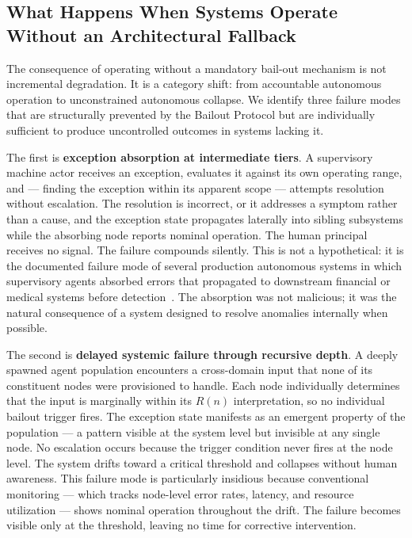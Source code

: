 \subsection{What Happens When Systems Operate Without an Architectural Fallback}

The consequence of operating without a mandatory bail-out mechanism is not incremental degradation. It is a category shift: from accountable autonomous operation to unconstrained autonomous collapse. We identify three failure modes that are structurally prevented by the Bailout Protocol but are individually sufficient to produce uncontrolled outcomes in systems lacking it.

The first is \textbf{exception absorption at intermediate tiers}. A supervisory machine actor receives an exception, evaluates it against its own operating range, and --- finding the exception within its apparent scope --- attempts resolution without escalation. The resolution is incorrect, or it addresses a symptom rather than a cause, and the exception state propagates laterally into sibling subsystems while the absorbing node reports nominal operation. The human principal receives no signal. The failure compounds silently. This is not a hypothetical: it is the documented failure mode of several production autonomous systems in which supervisory agents absorbed errors that propagated to downstream financial or medical systems before detection~\cite{islam2023autonomous, liu2024tiered}. The absorption was not malicious; it was the natural consequence of a system designed to resolve anomalies internally when possible.

The second is \textbf{delayed systemic failure through recursive depth}. A deeply spawned agent population encounters a cross-domain input that none of its constituent nodes were provisioned to handle. Each node individually determines that the input is marginally within its $R(n)$ interpretation, so no individual bailout trigger fires. The exception state manifests as an emergent property of the population --- a pattern visible at the system level but invisible at any single node. No escalation occurs because the trigger condition never fires at the node level. The system drifts toward a critical threshold and collapses without human awareness. This failure mode is particularly insidious because conventional monitoring --- which tracks node-level error rates, latency, and resource utilization --- shows nominal operation throughout the drift. The failure becomes visible only at the threshold, leaving no time for corrective intervention.

